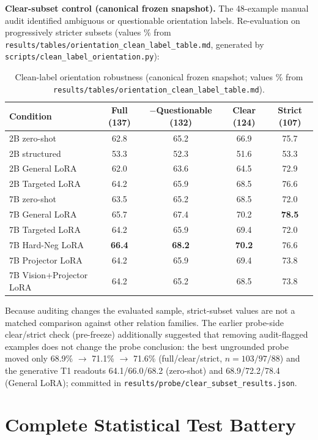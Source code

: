 \textbf{Clear-subset control (canonical frozen snapshot).}
The 48-example manual audit identified ambiguous or questionable orientation
labels. Re-evaluation on progressively stricter subsets (values \% from
\texttt{results/tables/orientation\_clean\_label\_table.md}, generated by
\texttt{scripts/clean\_label\_orientation.py}):
\begin{table}[h]
\centering
\footnotesize
\caption{Clean-label orientation robustness (canonical frozen snapshot;
values \% from
\texttt{results/tables/orientation\_clean\_label\_table.md}).}
\label{tab:cleanlabel}
\begin{tabular}{lcccc}
\toprule
Condition & Full (137) & $-$Questionable (132) & Clear (124) & Strict (107) \\
\midrule
2B zero-shot & 62.8 & 65.2 & 66.9 & 75.7 \\
2B structured & 53.3 & 52.3 & 51.6 & 53.3 \\
2B General LoRA & 62.0 & 63.6 & 64.5 & 72.9 \\
2B Targeted LoRA & 64.2 & 65.9 & 68.5 & 76.6 \\
7B zero-shot & 63.5 & 65.2 & 68.5 & 72.0 \\
7B General LoRA & 65.7 & 67.4 & 70.2 & \textbf{78.5} \\
7B Targeted LoRA & 64.2 & 65.9 & 69.4 & 72.0 \\
7B Hard-Neg LoRA & \textbf{66.4} & \textbf{68.2} & \textbf{70.2} & 76.6 \\
7B Projector LoRA & 64.2 & 65.9 & 69.4 & 73.8 \\
7B Vision+Projector LoRA & 64.2 & 65.2 & 68.5 & 73.8 \\
\bottomrule
\end{tabular}
\end{table}
Because auditing changes the evaluated sample, strict-subset values are not a
matched comparison against other relation families. The earlier probe-side
clear/strict check (pre-freeze) additionally suggested that removing
audit-flagged examples does not change the probe conclusion: the best
ungrounded probe moved only
68.9\% $\rightarrow$ 71.1\% $\rightarrow$ 71.6\% (full/clear/strict,
$n=103/97/88$) and the generative T1 readouts 64.1/66.0/68.2 (zero-shot) and
68.9/72.2/78.4 (General LoRA); committed in
\texttt{results/probe/clear\_subset\_results.json}.

\section{Complete Statistical Test Battery}
\label{app:stats}

